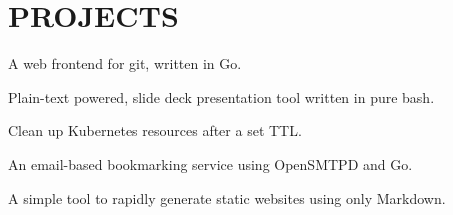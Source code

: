 \documentclass[]{config}
\begin{document}
\begin{minipage}[t]{0.66\textwidth}

\section{PROJECTS}

A web frontend for git, written in Go.
\sectionsep

Plain-text powered, slide deck presentation tool written in pure bash. \\
\sectionsep

Clean up Kubernetes resources after a set TTL. \\
\sectionsep

An email-based bookmarking service using OpenSMTPD and Go. \\
\sectionsep

A simple tool to rapidly generate static websites using only Markdown. \\
\sectionsep



\end{minipage} 
\end{document}
